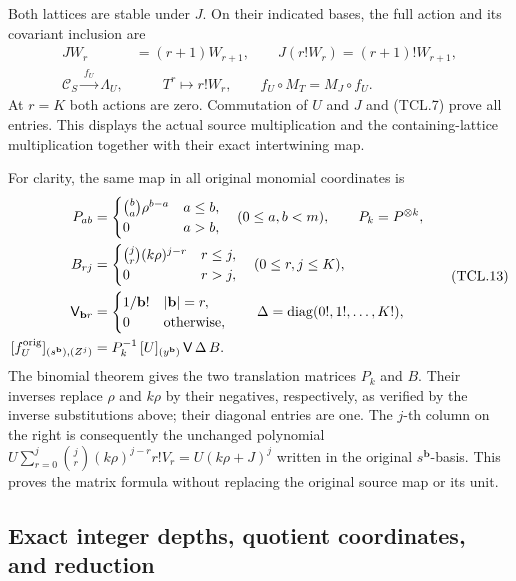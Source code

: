 Both lattices are stable under \(J\). On their indicated bases,
the full action and its covariant inclusion are
\[
 \begin{split}
 J W_r&=(r+1)W_{r+1},\qquad
 J(r!W_r)=(r+1)!W_{r+1},\\
 \mathcal C_S\xrightarrow{\ f_U\ }\Lambda_U,
 &\qquad T^r\longmapsto r!W_r,\qquad
 f_U\circ M_T=M_J\circ f_U.
 \end{split}
 \tag{TCL.12}\label{eq:tcl-action-matrix}
\]
At \(r=K\) both actions are zero. Commutation of \(U\) and
\(J\) and (TCL.7) prove all entries. This displays the actual
source multiplication and the containing-lattice multiplication
together with their exact intertwining map.

For clarity, the same map in all original monomial coordinates is
\[
 \begin{split}
 P_{ab}&=\begin{cases}\binom ba\rho^{b-a}&a\leq b,\\0&a>b,
                 \end{cases}\quad(0\leq a,b<m),\qquad P_k=P^{\otimes k},\\
 B_{rj}&=\begin{cases}\binom jr(k\rho)^{j-r}&r\leq j,\\0&r>j,
                 \end{cases}\quad(0\leq r,j\leq K),\\
 \mathsf V_{\mathbf b r}&=
       \begin{cases}1/\mathbf b!&|\mathbf b|=r,\\0&\text{otherwise},
       \end{cases}\qquad \Delta=\operatorname{diag}(0!,1!,\ldots,K!),\\
 [f_U^{\rm orig}]_{(s^{\mathbf b}),(Z^j)}
     &=P_k^{-1}\,[U]_{(y^{\mathbf b})}\,\mathsf V\,\Delta\,B.
 \end{split}
 \tag{TCL.13}\label{eq:tcl-original-matrix}
\]
The binomial theorem gives the two translation matrices \(P_k\)
and \(B\). Their inverses replace \(\rho\) and \(k\rho\) by
their negatives, respectively, as verified by the inverse substitutions
above; their diagonal entries are one. The \(j\)-th column on the
right is consequently the unchanged polynomial
\(U\sum_{r=0}^j\binom jr(k\rho)^{j-r}r!V_r=U(k\rho+J)^j\)
written in the original \(s^{\mathbf b}\)-basis. This proves the
matrix formula without replacing the original source map or its unit.

\subsection{Exact integer depths, quotient coordinates, and reduction}

